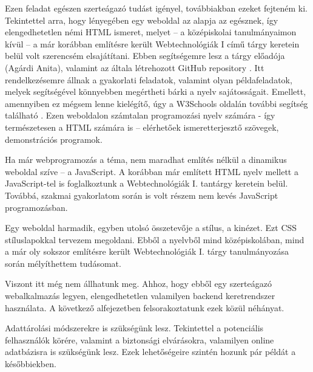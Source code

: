 


Ezen feladat egészen szerteágazó tudást igényel, továbbiakban ezeket fejteném ki. Tekintettel arra, hogy lényegében egy weboldal az alapja az egésznek, így elengedhetetlen némi HTML ismeret, melyet – a középiskolai tanulmányaimon kívül – a már korábban említésre került Webtechnológiák I című tárgy keretein belül volt szerencsém elsajátítani. Ebben segítségemre lesz a tárgy előadója (Agárdi Anita), valamint az általa létrehozott GitHub repository \cite{webtechgithub}. Itt rendelkezésemre állnak a gyakorlati feladatok, valamint olyan példafeladatok, melyek segítségével könnyebben megértheti bárki a nyelv sajátosságait. Emellett, amennyiben ez mégsem lenne kielégítő, úgy a W3Schools oldalán további segítség található \cite{w3schools}. Ezen weboldalon számtalan programozási nyelv számára - így természetesen a HTML számára is – elérhetőek ismeretterjesztő szövegek, demonstrációs programok.

Ha már webprogramozás a téma, nem maradhat említés nélkül a dinamikus weboldal szíve – a JavaScript. A korábban már említett HTML nyelv mellett a JavaScript-tel is foglalkoztunk a Webtechnológiák I. tantárgy keretein belül. Továbbá, szakmai gyakorlatom során is volt részem nem kevés JavaScript programozásban.

Egy weboldal harmadik, egyben utolsó összetevője a stílus, a kinézet. Ezt CSS stíluslapokkal tervezem megoldani. Ebből a nyelvből mind középiskolában, mind a már oly sokszor említésre került Webtechnológiák I. tárgy tanulmányozása során mélyíthettem tudásomat.

Viszont itt még nem állhatunk meg. Ahhoz, hogy ebből egy szerteágazó webalkalmazás legyen, elengedhetetlen valamilyen backend keretrendszer használata. A következő alfejezetben felsorakoztatunk ezek közül néhányat.

Adattárolási módszerekre is szükségünk lesz. Tekintettel a potenciális felhasználók körére, valamint a biztonsági elvárásokra, valamilyen online adatbázisra is szükségünk lesz. Ezek lehetőségeire szintén hozunk pár példát a későbbiekben.


